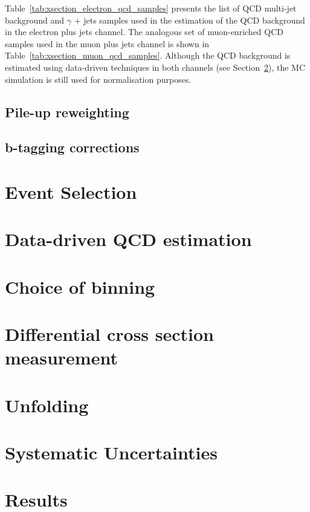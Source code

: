 Table~\ref{tab:xsection_electron_qcd_samples} presents the list of QCD multi-jet background and $\gamma$ + jets samples
used in the estimation of the QCD background in the electron plus jets channel. The analogous set of muon-enriched QCD
samples used in the muon plus jets channel is shown in Table~\ref{tab:xsection_muon_qcd_samples}. Although the QCD
background is estimated using data-driven techniques in both channels (see Section~\ref{s_xsection:data_driven_QCD}),
the MC simulation is still used for normalisation purposes.



\subsection{Pile-up reweighting}
\label{sss_xsection:pileup_reweighting}

\subsection{b-tagging corrections}
\label{ss_xsection:btagging_corrections}

\section{Event Selection}
\label{s_xsection:event_selection}

\section{Data-driven QCD estimation}
\label{s_xsection:data_driven_QCD}

\section{Choice of binning}
\label{s_xsection:binning}

\section{Differential cross section measurement}
\label{s_xsection:measurement}

\section{Unfolding}
\label{s_xsection:unfolding}

\section{Systematic Uncertainties}
\label{s_xsection:systematics}

\section{Results}
\label{s_xsection:results}

